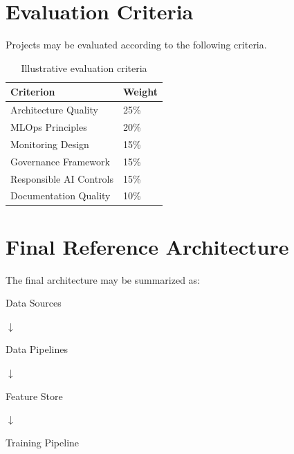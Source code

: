 \section{Evaluation Criteria}

Projects may be evaluated according to the following criteria.

\begin{table}[h]
\centering
\begin{tabular}{p{8cm}p{2cm}}
\toprule
Criterion & Weight \\
\midrule
Architecture Quality & 25\% \\
MLOps Principles & 20\% \\
Monitoring Design & 15\% \\
Governance Framework & 15\% \\
Responsible AI Controls & 15\% \\
Documentation Quality & 10\% \\
\bottomrule
\end{tabular}
\caption{Illustrative evaluation criteria}
\end{table}

\section{Final Reference Architecture}

The final architecture may be summarized as:

\begin{center}
Data Sources
\end{center}

\begin{center}
$\downarrow$
\end{center}

\begin{center}
Data Pipelines
\end{center}

\begin{center}
$\downarrow$
\end{center}

\begin{center}
Feature Store
\end{center}

\begin{center}
$\downarrow$
\end{center}

\begin{center}
Training Pipeline
\end{center}

